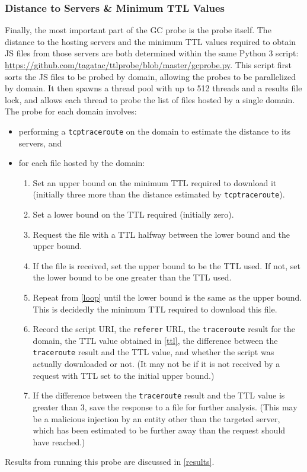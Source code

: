 \subsubsection{Distance to Servers \& Minimum TTL Values}\label{distance-ttl}
Finally, the most important part of the GC probe is the probe itself.
The distance to the hosting servers and the minimum TTL values required to obtain JS files from those servers are both determined within the same Python 3 script: \url{https://github.com/tagatac/ttlprobe/blob/master/gcprobe.py}.
This script first sorts the JS files to be probed by domain, allowing the probes to be parallelized by domain.
It then spawns a thread pool with up to 512 threads and a results file lock, and allows each thread to probe the list of files hosted by a single domain.
The probe for each domain involves:
\begin{itemize}\addtolength{\itemsep}{-.35\baselineskip}
	\item performing a \texttt{tcptraceroute} on the domain to estimate the distance to its servers, and
	\item for each file hosted by the domain:
	\begin{enumerate}
		\item Set an upper bound on the minimum TTL required to download it (initially three more than the distance estimated by \texttt{tcptraceroute}).
		\item Set a lower bound on the TTL required (initially zero).
		\item\label{loop} Request the file with a TTL halfway between the lower bound and the upper bound.
		\item If the file is received, set the upper bound to be the TTL used.
			If not, set the lower bound to be one greater than the TTL used.
		\item\label{ttl} Repeat from \ref{loop} until the lower bound is the same as the upper bound.
			This is decidedly the minimum TTL required to download this file.
		\item Record the script URI, the \texttt{referer} URL, the \texttt{traceroute} result for the domain, the TTL value obtained in \ref{ttl}, the difference between the \texttt{traceroute} result and the TTL value, and whether the script was actually downloaded or not.
			(It may not be if it is not received by a request with TTL set to the initial upper bound.)
		\item If the difference between the \texttt{traceroute} result and the TTL value is greater than 3, save the response to a file for further analysis.
			(This may be a malicious injection by an entity other than the targeted server, which has been estimated to be further away than the request should have reached.)
	\end{enumerate}
\end{itemize}
Results from running this probe are discussed in \autoref{results}.